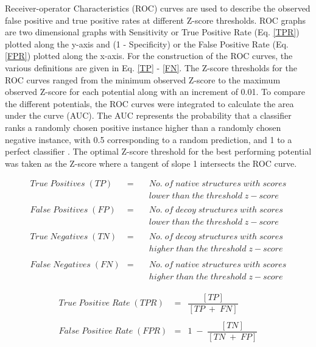 \endgroup
Receiver-operator Characteristics (ROC) curves are used to describe the observed false positive and true positive rates at different Z-score thresholds. ROC graphs are two dimensional graphs with Sensitivity or True Positive Rate (Eq. \ref{TPR}) plotted along the y-axis and (1 - Specificity) or the False Positive Rate (Eq. \ref{FPR}) plotted along the x-axis. For the construction of the ROC curves, the various definitions are given in Eq. \ref{TP} - \ref{FN}. The Z-score thresholds for the ROC curves ranged from the minimum observed Z-score to the maximum observed Z-score for each potential along with an increment of 0.01. To compare the different potentials, the ROC curves were integrated to calculate the area under the curve (AUC). The AUC represents the probability that a classifier ranks a randomly chosen positive instance higher than a randomly chosen negative instance, with 0.5 corresponding to a random prediction, and 1 to a perfect classifier \citep{Fawcett2004}. The optimal Z-score threshold for the best performing potential was taken as the Z-score where a tangent of slope 1 intersects the ROC curve.


\begingroup
\begin{eqnarray}
True\;Positives\;(TP) &=& \quad No.\;of\;native\;structures\;with\;scores \nonumber \\
&&\quad lower\;than\;the\;threshold\;z-score \label{TP} \\ 
\nonumber \\
False\;Positives\;(FP) &=& \quad No.\;of\;decoy\;structures\;with\;scores \nonumber \\
&&\quad lower\;than\;the\;threshold\;z-score \\
\nonumber \\
True\;Negatives\;(TN) &=& \quad No.\;of\;decoy\;structures\;with\;scores \nonumber \\
&& \quad higher\;than\;the\;threshold\;z-score \\
\nonumber \\
False\;Negatives\;(FN) &=& \quad No.\;of\;native\;structures\;with\;scores \nonumber \\
&& \quad higher\;than\;the\;threshold\;z-score  \label{FN}
\end{eqnarray}
\endgroup

\begingroup
\large
\begin{eqnarray}
True\;Positive\;Rate\;(TPR) &=& \dfrac{[TP]}{[TP\;+\;FN]} \label{TPR} \\
\nonumber \\
False\;Positive\;Rate\;(FPR) &=& 1\;-\; \dfrac{[TN]}{[TN\;+\;FP]} \label{FPR}
\end{eqnarray}
\endgroup



